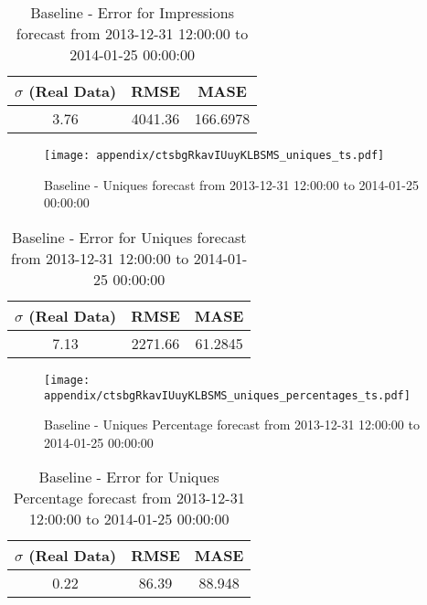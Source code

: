 \begin{table}[H]
\centering
\footnotesize
\begin{tabular}{ccc}
$\sigma$ (Real Data) & RMSE & MASE   \\ \hline
3.76 & 4041.36 & 166.6978 \\
\end{tabular}

\vspace{0.5cm}

\caption{
Baseline - Error for Impressions forecast from 2013-12-31 12:00:00 to 2014-01-25 00:00:00}
\end{table}

\begin{figure}[H] \begin{center} \leavevmode
\texttt{[image: appendix/ctsbgRkavIUuyKLBSMS\_uniques\_ts.pdf]} \caption{
Baseline - Uniques forecast from 2013-12-31 12:00:00 to 2014-01-25 00:00:00} \label{fig:appendix/ctsbgRkavIUuyKLBSMS_uniques_ts.pdf} \end{center}
\end{figure}

\begin{table}[H]
\centering
\footnotesize
\begin{tabular}{ccc}
$\sigma$ (Real Data) & RMSE & MASE   \\ \hline
7.13 & 2271.66 & 61.2845 \\
\end{tabular}

\vspace{0.5cm}

\caption{
Baseline - Error for Uniques forecast from 2013-12-31 12:00:00 to 2014-01-25 00:00:00}
\end{table}

\begin{figure}[H] \begin{center} \leavevmode
\texttt{[image: appendix/ctsbgRkavIUuyKLBSMS\_uniques\_percentages\_ts.pdf]} \caption{
Baseline - Uniques Percentage forecast from 2013-12-31 12:00:00 to 2014-01-25 00:00:00} \label{fig:appendix/ctsbgRkavIUuyKLBSMS_uniques_percentages_ts.pdf} \end{center}
\end{figure}

\begin{table}[H]
\centering
\footnotesize
\begin{tabular}{ccc}
$\sigma$ (Real Data) & RMSE & MASE   \\ \hline
0.22 & 86.39 & 88.948 \\
\end{tabular}

\vspace{0.5cm}

\caption{
Baseline - Error for Uniques Percentage forecast from 2013-12-31 12:00:00 to 2014-01-25 00:00:00}
\end{table}

